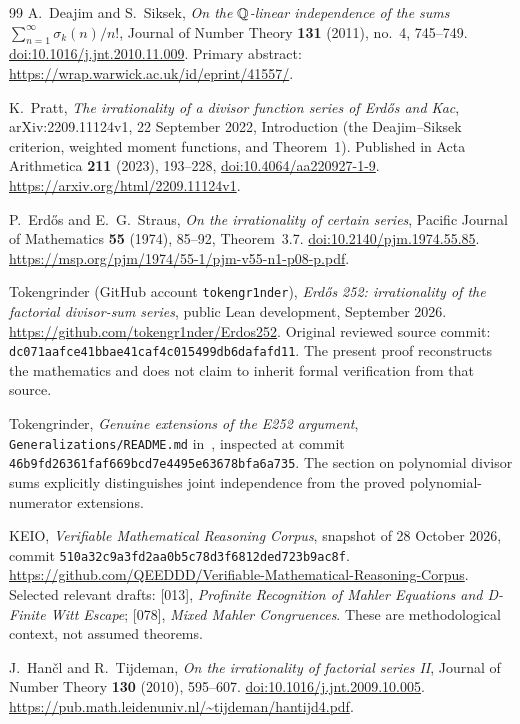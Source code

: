 \begin{thebibliography}{99}
A.~Deajim and S.~Siksek,
\emph{On the $\mathbb Q$-linear independence of the sums
$\sum_{n=1}^{\infty}\sigma_k(n)/n!$},
Journal of Number Theory \textbf{131} (2011), no.~4, 745--749.
\href{https://doi.org/10.1016/j.jnt.2010.11.009}{doi:10.1016/j.jnt.2010.11.009}.
Primary abstract: \url{https://wrap.warwick.ac.uk/id/eprint/41557/}.

K.~Pratt, \emph{The irrationality of a divisor function series of
Erd\H{o}s and Kac}, arXiv:2209.11124v1, 22 September 2022,
Introduction (the Deajim--Siksek criterion, weighted moment functions,
and Theorem~1). Published in Acta Arithmetica \textbf{211} (2023), 193--228,
\href{https://doi.org/10.4064/aa220927-1-9}{doi:10.4064/aa220927-1-9}.
\url{https://arxiv.org/html/2209.11124v1}.

P.~Erd\H{o}s and E.~G.~Straus,
\emph{On the irrationality of certain series},
Pacific Journal of Mathematics \textbf{55} (1974), 85--92,
Theorem~3.7.
\href{https://doi.org/10.2140/pjm.1974.55.85}{doi:10.2140/pjm.1974.55.85}.
\url{https://msp.org/pjm/1974/55-1/pjm-v55-n1-p08-p.pdf}.

Tokengrinder (GitHub account \texttt{tokengr1nder}),
\emph{Erd\H{o}s 252: irrationality of the factorial divisor-sum series},
public Lean development, September 2026.
\url{https://github.com/tokengr1nder/Erdos252}.
Original reviewed source commit:
\nolinkurl{dc071aafce41bbae41caf4c015499db6dafafd11}.
The present proof reconstructs the mathematics and does not claim
to inherit formal verification from that source.

Tokengrinder, \emph{Genuine extensions of the E252 argument},
\texttt{Generalizations/README.md} in~\cite{TG}, inspected at commit
\nolinkurl{46b9fd26361faf669bcd7e4495e63678bfa6a735}.
The section on polynomial divisor sums explicitly distinguishes
joint independence from the proved polynomial-numerator extensions.

KEIO, \emph{Verifiable Mathematical Reasoning Corpus},
snapshot of 28 October 2026, commit
\nolinkurl{510a32c9a3fd2aa0b5c78d3f6812ded723b9ac8f}.
\url{https://github.com/QEEDDD/Verifiable-Mathematical-Reasoning-Corpus}.
Selected relevant drafts: [013], \emph{Profinite Recognition of Mahler
Equations and D-Finite Witt Escape}; [078], \emph{Mixed Mahler
Congruences}. These are methodological context, not assumed theorems.

J.~Han\v{c}l and R.~Tijdeman,
\emph{On the irrationality of factorial series II},
Journal of Number Theory \textbf{130} (2010), 595--607.
\href{https://doi.org/10.1016/j.jnt.2009.10.005}{doi:10.1016/j.jnt.2009.10.005}.
\url{https://pub.math.leidenuniv.nl/~tijdeman/hantijd4.pdf}.


\end{thebibliography}
